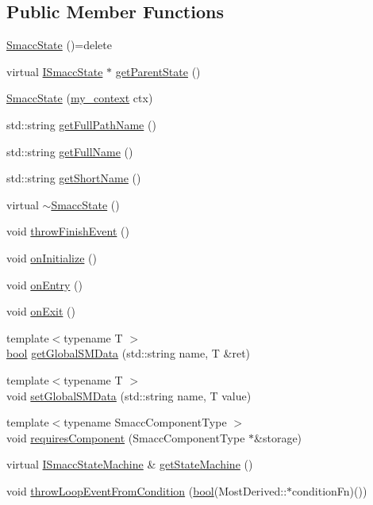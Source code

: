 \subsection*{Public Member Functions}
\begin{DoxyCompactItemize}
\item 
\hyperlink{classsmacc_1_1SmaccState_a2fbeaca0f063a909d17de2c3040c8d17}{Smacc\+State} ()=delete
\item 
virtual \hyperlink{classsmacc_1_1ISmaccState}{I\+Smacc\+State} $\ast$ \hyperlink{classsmacc_1_1SmaccState_a69fc0aa1dbe0c00501f2890616225004}{get\+Parent\+State} ()
\item 
\hyperlink{classsmacc_1_1SmaccState_adc225018fe91da47e6e9f1d20150b26a}{Smacc\+State} (\hyperlink{structsmacc_1_1SmaccState_1_1my__context}{my\+\_\+context} ctx)
\item 
std\+::string \hyperlink{classsmacc_1_1SmaccState_a1a2ae90b80ba8ca88b4b9b66972abfbd}{get\+Full\+Path\+Name} ()
\item 
std\+::string \hyperlink{classsmacc_1_1SmaccState_a897dbdfe52a8b944d4bf1844ddcc3aa5}{get\+Full\+Name} ()
\item 
std\+::string \hyperlink{classsmacc_1_1SmaccState_a4db028a85244653e48957d2b3371413d}{get\+Short\+Name} ()
\item 
virtual \hyperlink{classsmacc_1_1SmaccState_a41b2515faf76648c6d69fe09108d2691}{$\sim$\+Smacc\+State} ()
\item 
void \hyperlink{classsmacc_1_1SmaccState_a56ccdfaf818ed6409dcbd4ab8b01c60e}{throw\+Finish\+Event} ()
\item 
void \hyperlink{classsmacc_1_1SmaccState_a49e958861b6ddbe9468e39c1919fde92}{on\+Initialize} ()
\item 
void \hyperlink{classsmacc_1_1SmaccState_a4a10a74fdbe51a798b8d651668b8ed9a}{on\+Entry} ()
\item 
void \hyperlink{classsmacc_1_1SmaccState_a82ca7c69153e86dc5eedf3f909560f3a}{on\+Exit} ()
\item 
{\footnotesize template$<$typename T $>$ }\\\hyperlink{classbool}{bool} \hyperlink{classsmacc_1_1SmaccState_ad53b5be2760eb7ffb50f3b2e542b65f1}{get\+Global\+S\+M\+Data} (std\+::string name, T \&ret)
\item 
{\footnotesize template$<$typename T $>$ }\\void \hyperlink{classsmacc_1_1SmaccState_a98f2673b257479e0a3615d5d8279a591}{set\+Global\+S\+M\+Data} (std\+::string name, T value)
\item 
{\footnotesize template$<$typename Smacc\+Component\+Type $>$ }\\void \hyperlink{classsmacc_1_1SmaccState_a2febb778d5c3d80b9c034576b5a92b65}{requires\+Component} (Smacc\+Component\+Type $\ast$\&storage)
\item 
virtual \hyperlink{classsmacc_1_1ISmaccStateMachine}{I\+Smacc\+State\+Machine} \& \hyperlink{classsmacc_1_1SmaccState_afc39f8e0ca4001b2159a100da2fccd0e}{get\+State\+Machine} ()
\item 
void \hyperlink{classsmacc_1_1SmaccState_a4f3083a54914820cd7b9eb5a6221f29f}{throw\+Loop\+Event\+From\+Condition} (\hyperlink{classbool}{bool}(Most\+Derived\+::$\ast$condition\+Fn)())
\end{DoxyCompactItemize}
